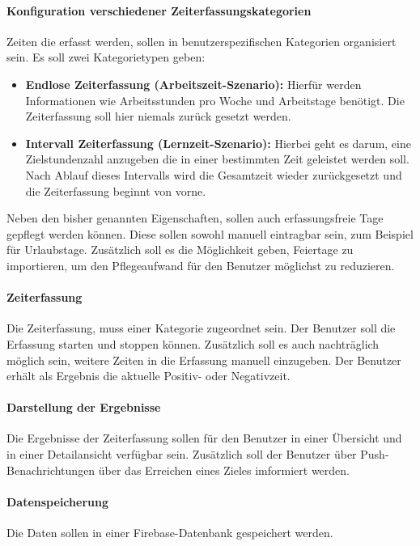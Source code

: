 \paragraph{Konfiguration verschiedener Zeiterfassungskategorien}
Zeiten die erfasst werden, sollen in benutzerspezifischen Kategorien organisiert sein. 
Es soll zwei Kategorietypen geben: 
\begin{itemize}
    \item \textbf{Endlose Zeiterfassung (Arbeitszeit-Szenario):} Hierfür werden 
    Informationen wie Arbeitsstunden pro Woche und Arbeitstage benötigt. Die Zeiterfassung soll 
    hier niemals zurück gesetzt werden.
    \item \textbf{Intervall Zeiterfassung (Lernzeit-Szenario):} Hierbei geht es darum, eine 
    Zielstundenzahl anzugeben die in einer bestimmten Zeit geleistet werden soll. Nach Ablauf dieses Intervalls 
    wird die Gesamtzeit wieder zurückgesetzt und die Zeiterfassung beginnt von vorne. 
\end{itemize} 
Neben den bisher genannten Eigenschaften, sollen auch erfassungsfreie Tage gepflegt werden können. Diese sollen 
sowohl manuell eintragbar sein, zum Beispiel für Urlaubstage. Zusätzlich soll es die Möglichkeit geben, 
Feiertage zu importieren, um den Pflegeaufwand für den Benutzer möglichst zu reduzieren.
\paragraph{Zeiterfassung}
Die Zeiterfassung, muss einer Kategorie zugeordnet sein. Der Benutzer soll die Erfassung starten und stoppen können. 
Zusätzlich soll es auch nachträglich möglich sein, weitere Zeiten in die Erfassung manuell einzugeben. 
Der Benutzer erhält als Ergebnis die aktuelle Positiv- oder Negativzeit. 
\paragraph{Darstellung der Ergebnisse}
Die Ergebnisse der Zeiterfassung sollen für den Benutzer in einer Übersicht und in einer Detailansicht 
verfügbar sein. Zusätzlich soll der Benutzer über Push-Benachrichtungen über das Erreichen eines Zieles 
imformiert werden. 
\paragraph{Datenspeicherung}
Die Daten sollen in einer Firebase-Datenbank gespeichert werden. 
